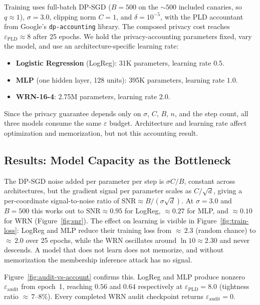 \documentclass[10pt]{article}
\newcommand{\eps}{\varepsilon}
\newcommand{\del}{\delta}
\begin{document}
Training uses full-batch DP-SGD ($B = 500$ on the ${\sim}500$ included canaries, so $q \approx 1$), $\sigma = 3.0$, clipping norm $C = 1$, and $\del = 10^{-5}$, with the PLD accountant from Google's \texttt{dp-accounting} library. The composed privacy cost reaches $\eps_{\mathrm{PLD}} \approx 8$ after 25 epochs. We hold the privacy-accounting parameters fixed, vary the model, and use an architecture-specific learning rate:
\begin{itemize}[nosep]
\item \textbf{Logistic Regression} (LogReg): 31K parameters, learning rate $0.5$.
\item \textbf{MLP} (one hidden layer, 128 units): 395K parameters, learning rate $1.0$.
\item \textbf{WRN-16-4}: 2.75M parameters, learning rate $2.0$.
\end{itemize}
Since the privacy guarantee depends only on $\sigma$, $C$, $B$, $n$, and the step count, all three models consume the same $\eps$ budget. Architecture and learning rate affect optimization and memorization, but not this accounting result.

\subsection{Results: Model Capacity as the Bottleneck}

The DP-SGD noise added per parameter per step is $\sigma C / B$, constant across architectures, but the gradient signal per parameter scales as $C/\sqrt{d}$, giving a per-coordinate signal-to-noise ratio of $\mathrm{SNR} \approx B / (\sigma \sqrt{d})$. At $\sigma = 3.0$ and $B = 500$ this works out to $\mathrm{SNR} \approx 0.95$ for LogReg, $\approx 0.27$ for MLP, and $\approx 0.10$ for WRN (Figure~\ref{fig:snr}). The effect on learning is visible in Figure~\ref{fig:train-loss}: LogReg and MLP reduce their training loss from ${\approx}\,2.3$ (random chance) to ${\approx}\,2.0$ over 25 epochs, while the WRN oscillates around $\ln 10 \approx 2.30$ and never descends. A model that does not learn does not memorize, and without memorization the membership inference attack has no signal.

Figure~\ref{fig:audit-vs-account} confirms this. LogReg and MLP produce nonzero $\eps_{\mathrm{audit}}$ from epoch~1, reaching $0.56$ and $0.64$ respectively at $\eps_{\mathrm{PLD}} = 8.0$ (tightness ratio ${\approx}\,7$--$8\%$). Every completed WRN audit checkpoint returns $\eps_{\mathrm{audit}} = 0$.
\end{document}

